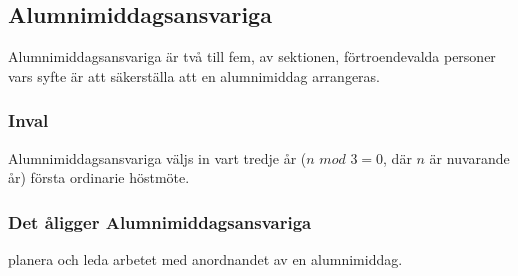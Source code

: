 \subsection{Alumnimiddagsansvariga}
Alumnimiddagsansvariga är två till fem, av sektionen, förtroendevalda personer vars syfte är att säkerställa att en alumnimiddag arrangeras.

\subsubsection{Inval}
Alumnimiddagsansvariga väljs in vart tredje år ($n \textit{ mod } 3 = 0$, där $n$ är
nuvarande år) första ordinarie höstmöte.
\subsubsection{Det åligger Alumnimiddagsansvariga}
\begin{att}
  \item planera och leda arbetet med anordnandet av en alumnimiddag.
\end{att}